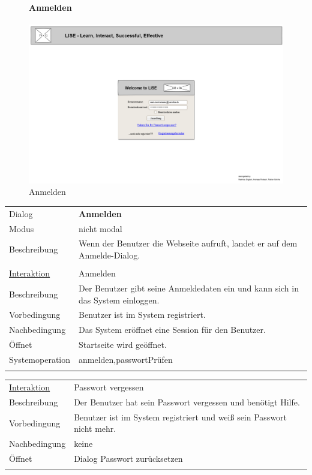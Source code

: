 \documentclass[12pt,a4paper]{article}
\begin{document}
{\begin{figure}[H]
	\paragraph{Anmelden}
	\includegraphics[width=\textwidth]{Bilder/Mockups/GUI/Anmeldung.png}
	\caption{Anmelden}
	\label{GuiAnmelden}
\end{figure}
\begin{tabular}{l p{12cm}}
	Dialog 	 & \textbf{Anmelden} \\ 
	Modus & nicht modal\\ 
	Beschreibung   	& Wenn der Benutzer die Webseite aufruft, landet er auf dem Anmelde-Dialog. \\\\
	
	\underline{Interaktion} 	 & Anmelden\\ 
	Beschreibung   	& Der Benutzer gibt seine Anmeldedaten ein und kann sich in das System einloggen.\\
	Vorbedingung	& Benutzer ist im System registriert.\\
	Nachbedingung	& Das System eröffnet eine Session für den Benutzer. \\
	Öffnet			& Startseite wird geöffnet.\\
	Systemoperation & anmelden,passwortPrüfen\\\\
\end{tabular}

\begin{tabular}{l p{12cm}}
	\underline{Interaktion} 	 & Passwort vergessen\\ 
	Beschreibung   	& Der Benutzer hat sein Passwort vergessen und benötigt Hilfe.\\
	Vorbedingung	& Benutzer ist im System registriert und weiß sein Passwort nicht mehr.\\
	Nachbedingung	& keine \\
	Öffnet			& Dialog \glqq Passwort zurücksetzen\grqq\\\\
\end{tabular}

}
\end{document}
